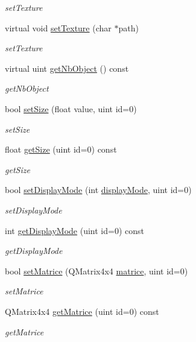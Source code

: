 \begin{DoxyCompactItemize}
\begin{DoxyCompactList}\small\item\em set\+Texture \end{DoxyCompactList}\item 
virtual void \hyperlink{classmyObjects_a6d524f010cd92b04067748407d8ca65b}{set\+Texture} (char $\ast$path)
\begin{DoxyCompactList}\small\item\em set\+Texture \end{DoxyCompactList}\item 
virtual uint \hyperlink{classmyObjects_a76824e5ca54bebb188d12ad5ba96678d}{get\+Nb\+Object} () const
\begin{DoxyCompactList}\small\item\em get\+Nb\+Object \end{DoxyCompactList}\item 
bool \hyperlink{classmyObjects_ad58306f67d79a54ac844e194b08704c6}{set\+Size} (float value, uint id=0)
\begin{DoxyCompactList}\small\item\em set\+Size \end{DoxyCompactList}\item 
float \hyperlink{classmyObjects_ad5181c0f75a5cbadbff0022402ae448d}{get\+Size} (uint id=0) const
\begin{DoxyCompactList}\small\item\em get\+Size \end{DoxyCompactList}\item 
bool \hyperlink{classmyObjects_a031a16bfe7b2bfdbf8207cd76cbf9ffd}{set\+Display\+Mode} (int \hyperlink{classmyObjects_a0bdb1559971230bace7098dadc2d4ace}{display\+Mode}, uint id=0)
\begin{DoxyCompactList}\small\item\em set\+Display\+Mode \end{DoxyCompactList}\item 
int \hyperlink{classmyObjects_a5441e2c5d4ad660a73abe3863c81b05a}{get\+Display\+Mode} (uint id=0) const
\begin{DoxyCompactList}\small\item\em get\+Display\+Mode \end{DoxyCompactList}\item 
bool \hyperlink{classmyObjects_a9100b324aa8e47f94de10c66aaa606b1}{set\+Matrice} (Q\+Matrix4x4 \hyperlink{classmyObjects_aef3994db6f38f3abbd4863acdac0612c}{matrice}, uint id=0)
\begin{DoxyCompactList}\small\item\em set\+Matrice \end{DoxyCompactList}\item 
Q\+Matrix4x4 \hyperlink{classmyObjects_a98380353733220fa9d80d149db01732e}{get\+Matrice} (uint id=0) const
\begin{DoxyCompactList}\small\item\em get\+Matrice \end{DoxyCompactList}\end{DoxyCompactItemize}
